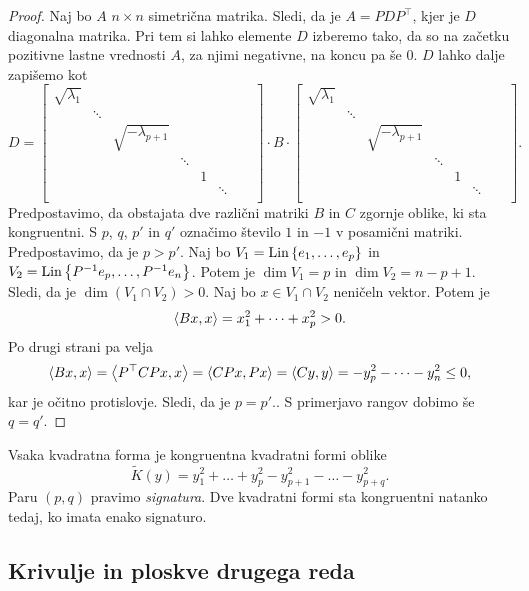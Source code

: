 \documentclass[12pt, a4paper]{article}
\begin{document}
\begin{proof}
Naj bo $A$ $n\times n$ simetrična matrika. Sledi, da je $A=PDP^\top$, kjer je $D$ diagonalna matrika. Pri tem si lahko elemente $D$ izberemo tako, da so na začetku pozitivne lastne vrednosti $A$, za njimi negativne, na koncu pa še $0$. $D$ lahko dalje zapišemo kot
\[
D=\begin{bmatrix}
\sqrt{\lambda_1} & & & & & & & \\
& \ddots & & & & & & \\
& & \sqrt{-\lambda_{p+1}} &  & & & \\
& & & \ddots & & & \\
& & & & 1 & \\
& & & & & \ddots \\
\end{bmatrix}
\cdot B\cdot
\begin{bmatrix}
\sqrt{\lambda_1} & & & & & & & \\
& \ddots & & & & & & \\
& & \sqrt{-\lambda_{p+1}} &  & & & \\
& & & \ddots & & & \\
& & & & 1 & \\
& & & & & \ddots \\
\end{bmatrix}.
\]
Predpostavimo, da obstajata dve različni matriki $B$ in $C$ zgornje oblike, ki sta kongruentni. S $p$, $q$, $p'$ in $q'$ označimo število $1$ in $-1$ v posamični matriki. Predpostavimo, da je $p>p'$. Naj bo $V_1=\operatorname{Lin}\left\{e_1,\dots,e_p\right\}$ in $V_2=\operatorname{Lin}\left\{P^{-1}e_p,\dots,P^{-1}e_n\right\}$. Potem je $\dim V_1=p$ in $\dim V_2=n-p+1$. Sledi, da je $\dim(V_1\cap V_2)>0$. Naj bo $x\in V_1\cap V_2$ neničeln vektor. Potem je
\[
\left\langle Bx,x\right\rangle=x_1^2+\dots+x_p^2>0.
\]
Po drugi strani pa velja
\[
\left\langle Bx,x\right\rangle=\left\langle P^\top CPx,x\right\rangle=\left\langle CPx,Px\right\rangle=\left\langle Cy,y\right\rangle=-y_p^2-\dots-y_n^2\leq 0,
\]
kar je očitno protislovje. Sledi, da je $p=p'$.. S primerjavo rangov dobimo še $q=q'$.
\end{proof}

\begin{posledica}
Vsaka kvadratna forma je kongruentna kvadratni formi oblike
\[
\widetilde{K}(y)=y_1^2+\dots+y_p^2-y_{p+1}^2-\dots-y_{p+q}^2.
\]
Paru $(p,q)$ pravimo \emph{signatura}. Dve kvadratni formi sta kongruentni natanko tedaj, ko imata enako signaturo.
\end{posledica}

\newpage

\subsection{Krivulje in ploskve drugega reda}
\end{document}
